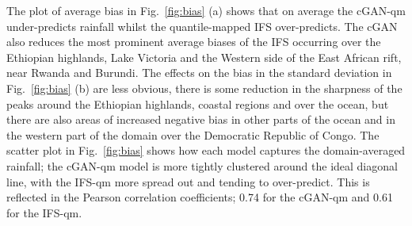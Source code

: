\documentclass[../main.tex]{subfiles}
\begin{document}
The plot of average bias in Fig.~\ref{fig:bias} (a) shows that on average the cGAN-qm under-predicts rainfall whilst the quantile-mapped IFS over-predicts. The cGAN also reduces the most prominent average biases of the IFS occurring over the Ethiopian highlands, Lake Victoria and the Western side of the East African rift, near Rwanda and Burundi. The effects on the bias in the standard deviation in Fig.~\ref{fig:bias} (b) are less obvious, there is some reduction in the sharpness of the peaks around the Ethiopian highlands, coastal regions and over the ocean, but there are also areas of increased negative bias in other parts of the ocean and in the western part of the domain over the Democratic Republic of Congo. The scatter plot in Fig.~\ref{fig:bias} shows how each model captures the domain-averaged rainfall; the cGAN-qm model is more tightly clustered around the ideal diagonal line, with the IFS-qm more spread out and tending to over-predict. This is reflected in the Pearson correlation coefficients; 0.74 for the cGAN-qm and 0.61 for the IFS-qm.
\end{document}
